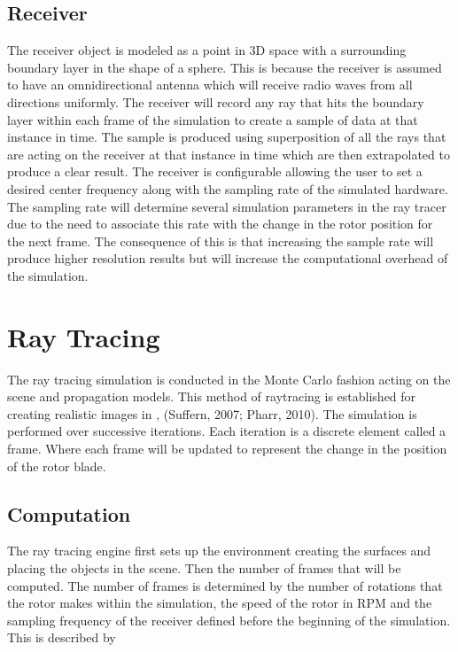 \subsection{Receiver}
The receiver object is modeled as a point in 3D space with a surrounding boundary layer in the shape of a sphere. This is because the receiver is assumed to have an omnidirectional antenna which will receive radio waves from all directions uniformly. The receiver will record any ray that hits the boundary layer within each frame of the simulation to create a sample of data at that instance in time.
The sample is produced using superposition of all the rays that are acting on the receiver at that instance in time which are then extrapolated to produce a clear result.
The receiver is configurable allowing the user to set a desired center frequency along with the sampling rate of the simulated hardware. The sampling rate will determine several simulation parameters in the ray tracer due to the need to associate this rate with the change in the rotor position for the next frame. The consequence of this is that increasing the sample rate will produce higher resolution results but will increase the computational overhead of the simulation.

\section{Ray Tracing}
The ray tracing simulation is conducted in the Monte Carlo fashion acting on the scene and propagation models. This method of raytracing is established for creating realistic images in \cite{Suffern2007}, \cite{Pharr2010} (Suffern, 2007; Pharr, 2010). The simulation is performed over successive iterations. Each iteration is a discrete element called a frame. Where each frame will be updated to represent the change in the position of the rotor blade.

\subsection{Computation}
The ray tracing engine first sets up the environment creating the surfaces and placing the objects in the scene. Then the number of frames that will be computed. The number of frames is determined by the number of rotations that the rotor makes within the simulation, the speed of the rotor in RPM and the sampling frequency of the receiver defined before the beginning of the simulation. This is described by

